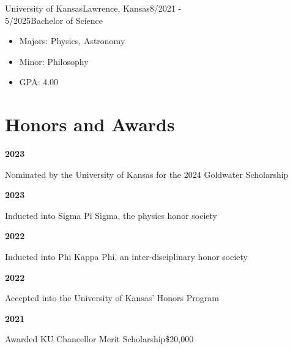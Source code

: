 \documentclass[12pt]{article}
\begin{document}
\begin{education}{University of Kansas}{Lawrence, Kansas}{8/2021 -\\ 5/2025}{Bachelor of Science}
  \begin{itemize}
    \item Majors: Physics, Astronomy
    \item Minor: Philosophy
    \item GPA: 4.00
  \end{itemize}
\end{education}



\section*{Honors and Awards}\vspace{-1ex}

\newcommand{\award}[3]{
  \begin{minipage}[t]{0.75in}
    \textbf{#1}
  \end{minipage}
  \begin{minipage}[t]{\dimexpr\textwidth-0.75in}
    #2\hfill#3
  \end{minipage}
}

\award{2023}{Nominated by the University of Kansas for the 2024 Goldwater Scholarship}{}
\award{2023}{Inducted into Sigma Pi Sigma, the physics honor society}{}
\award{2022}{Inducted into Phi Kappa Phi, an inter-disciplinary honor society}{}
\award{2022}{Accepted into the University of Kansas' Honors Program}{}
\award{2021}{Awarded KU Chancellor Merit Scholarship}{\$20,000}
\end{document}
